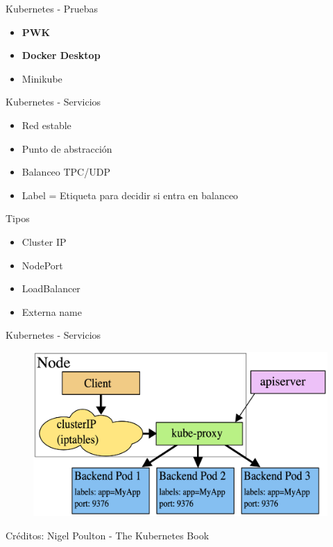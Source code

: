 \documentclass[aspectratio=169]{beamer}
\begin{document}
\begin{frame}{Kubernetes - Pruebas}

    \begin{itemize}
        \item \textbf{PWK}
        \item \textbf{Docker Desktop}
        \item Minikube
    \end{itemize}

\end{frame}


\begin{frame}{Kubernetes - Servicios}

    \begin{itemize}
        \item Red estable
        \item Punto de abstracción
        \item Balanceo TPC/UDP
        \item Label = Etiqueta para decidir si entra en balanceo
    \end{itemize}

    Tipos
    \begin{itemize}
            \item Cluster IP
            \item NodePort
            \item LoadBalancer
            \item Externa name
        \end{itemize}
\end{frame}

\begin{frame}{Kubernetes - Servicios}
    \begin{figure}
        \centering
        \includegraphics[width=0.65\linewidth]{Images/kubeservice1.png}
    \end{figure}
Créditos: Nigel Poulton - The Kubernetes Book
\end{frame}
\end{document}
